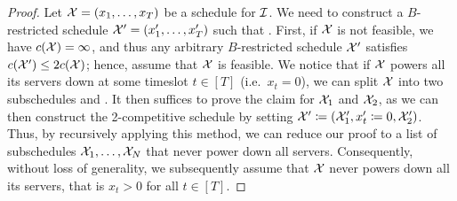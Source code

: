 \begin{proof}
Let $\mathcal{X}=(x_1,\dotsc,x_T)$ be a schedule for $\mathcal{I}$. We need to construct a $B$-restricted schedule $\mathcal{X}'=(x_1',\dotsc,x_T')$ such that .
First, if $\mathcal{X}$ is not feasible, we have $c(\mathcal{X})=\infty$, and thus any arbitrary $B$-restricted schedule $\mathcal{X}'$ satisfies $c(\mathcal{X}')\le2c(\mathcal{X})$; hence, assume that $\mathcal{X}$ is feasible. We notice that if $\mathcal{X}$ powers all its servers down at some timeslot $t\in[T]$ (i.e.\ $x_t=0$), we can split $\mathcal{X}$ into two subschedules  and . It then suffices to prove the claim for $\mathcal{X}_1$ and $\mathcal{X}_2$, as we can then construct the 2-competitive schedule by setting $\mathcal{X}'\coloneqq(\mathcal{X}_1',x_t'\coloneqq0,\mathcal{X}_2')$. Thus, by recursively applying this method, we can reduce our proof to a list of subschedules $\mathcal{X}_1,\dotsc,\mathcal{X}_N$ that never power down all servers. Consequently, without loss of generality, we subsequently assume that $\mathcal{X}$ never powers down all its servers, that is $x_t>0$ for all $t\in[T]$. 
	

\end{proof}
